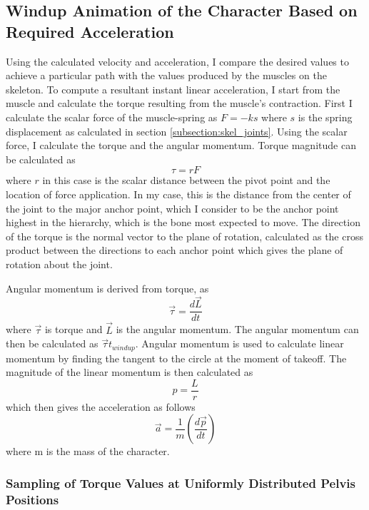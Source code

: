 \subsection{Windup Animation of the Character Based on Required Acceleration}
\label{subsection:torque_windup}

Using the calculated velocity and acceleration, I compare the desired values to achieve a particular path with the values produced by the muscles on the skeleton.  To compute a resultant instant linear acceleration, I start from the muscle and calculate the torque resulting from the muscle's contraction.  First I calculate the scalar force of the muscle-spring as $F = -k s$ where $s$ is the spring displacement as calculated in section \ref{subsection:skel_joints}.  Using the scalar force, I calculate the torque and the angular momentum.  Torque magnitude can be calculated as \[\tau = r F\] where $r$ in this case is the scalar distance between the pivot point and the location of force application.  In my case, this is the distance from the center of the joint to the major anchor point, which I consider to be the anchor point highest in the hierarchy, which is the bone most expected to move.  The direction of the torque is the normal vector to the plane of rotation, calculated as the cross product between the directions to each anchor point which gives the plane of rotation about the joint.

Angular momentum is derived from torque, as \[\vec{\tau} = \dfrac{d\vec{L}}{dt}\] where $\vec{\tau}$ is torque and $\vec{L}$ is the angular momentum.  The angular momentum can then be calculated as $\vec{\tau} t_{windup}$.  Angular momentum is used to calculate linear momentum by finding the tangent to the circle at the moment of takeoff.  The magnitude of the linear momentum is then calculated as \[p = \frac{L}{r}\] which then gives the acceleration as follows \[ \vec{a} = \frac{1}{m}\left(\dfrac{d\vec{p}}{dt}\right)\] where m is the mass of the character.

\subsubsection{Sampling of Torque Values at Uniformly Distributed Pelvis Positions}
\label{subsubsection:torque_sample}

